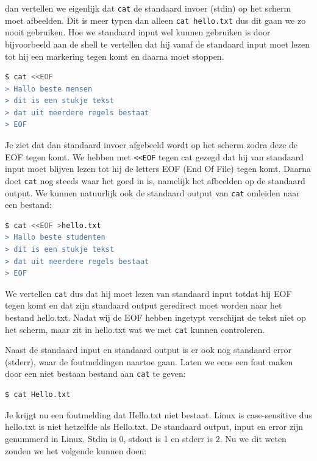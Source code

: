 dan vertellen we eigenlijk dat \texttt{cat} de standaard invoer (stdin) op het scherm moet afbeelden. Dit is meer typen dan alleen \texttt{cat hello.txt} dus dit gaan we zo nooit gebruiken. Hoe we standaard input wel kunnen gebruiken is door bijvoorbeeld aan de shell te vertellen dat hij vanaf de standaard input moet lezen tot hij een markering tegen komt en daarna moet stoppen.
\begin{lstlisting}[language=bash]
$ cat <<EOF
> Hallo beste mensen
> dit is een stukje tekst
> dat uit meerdere regels bestaat
> EOF
\end{lstlisting}
Je ziet dat dan standaard invoer afgebeeld wordt op het scherm zodra deze de EOF tegen komt. We hebben met \texttt{<<EOF} tegen cat gezegd dat hij van standaard input moet blijven lezen tot hij de letters EOF (End Of File) tegen komt. Daarna doet \texttt{cat} nog steeds waar het goed in is, namelijk het afbeelden op de standaard output. We kunnen natuurlijk ook de standaard output van \texttt{cat} omleiden naar een bestand:
\begin{lstlisting}[language=bash]
$ cat <<EOF >hello.txt
> Hallo beste studenten
> dit is een stukje tekst
> dat uit meerdere regels bestaat
> EOF
\end{lstlisting}
We vertellen \texttt{cat} dus dat hij moet lezen van standaard input totdat hij EOF tegen komt en dat zijn standaard output geredirect moet worden naar het bestand hello.txt. Nadat wij de EOF hebben ingetypt verschijnt de tekst niet op het scherm, maar zit in hello.txt wat we met \texttt{cat} kunnen controleren.

Naast de standaard input en standaard output is er ook nog standaard error (stderr), waar de foutmeldingen naartoe gaan.
Laten we eens een fout maken door een niet bestaan bestand aan \texttt{cat} te geven:

\begin{lstlisting}[language=bash]
$ cat Hello.txt
\end{lstlisting}

Je krijgt nu een foutmelding dat Hello.txt niet bestaat. Linux is case-sensitive dus hello.txt is niet hetzelfde als Hello.txt. De standaard output, input en error zijn genummerd in Linux. Stdin is 0, stdout is 1 en stderr is 2. Nu we dit weten zouden we het volgende kunnen doen:

